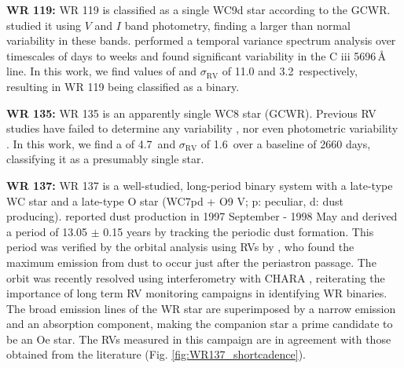 \textbf{WR 119:} WR 119 is classified as a single WC9d star according to the GCWR. \citet{2009Fahed} studied it using $V$ and $I$ band photometry, finding a larger than normal variability in these bands. \citet{2017Desforges} performed a temporal variance spectrum analysis over timescales of days to weeks and found significant variability in the  C {\sc iii} 5696\,\r{A} line. In this work, we find values of \DelRV{} and $\sigma_\textrm{RV}$ of 11.0 and 3.2\,\kms{} respectively, resulting in WR 119 being classified as a binary. 


\textbf{WR 135:} WR 135 is an apparently single WC8 star (GCWR). Previous RV studies have failed to determine any variability \citep{1999aNiemela}, nor even photometric variability \citep{1986MoffatShara}. In this work, we find a \DelRV{} of 4.7\,\kms{} and $\sigma_\textrm{RV}$ of 1.6\,\kms{} over a baseline of 2660 days, classifying it as a presumably single star.

\textbf{WR 137:} WR 137 is a well-studied, long-period binary system with a late-type WC star and a late-type O star (WC7pd + O9 V; p: peculiar, d: dust producing). \citet{1999MarchenkoDust} reported dust production in 1997 September - 1998 May and \citet{2001WilliamsDust} derived a period of 13.05 $\pm$ 0.15 years by tracking the periodic dust formation. This period was verified by the orbital analysis using RVs by \citet{2005Lefevre}, who found the maximum emission from dust to occur just after the periastron passage. The orbit was recently resolved using interferometry with CHARA \citep{2016Richardson}, reiterating the importance of long term RV monitoring campaigns in identifying WR binaries. The broad emission lines of the WR star are superimposed by a narrow emission and an absorption component, making the companion star a prime candidate to be an Oe star. The RVs measured in this campaign are in agreement with those obtained from the literature (Fig. \ref{fig:WR137_shortcadence}).

